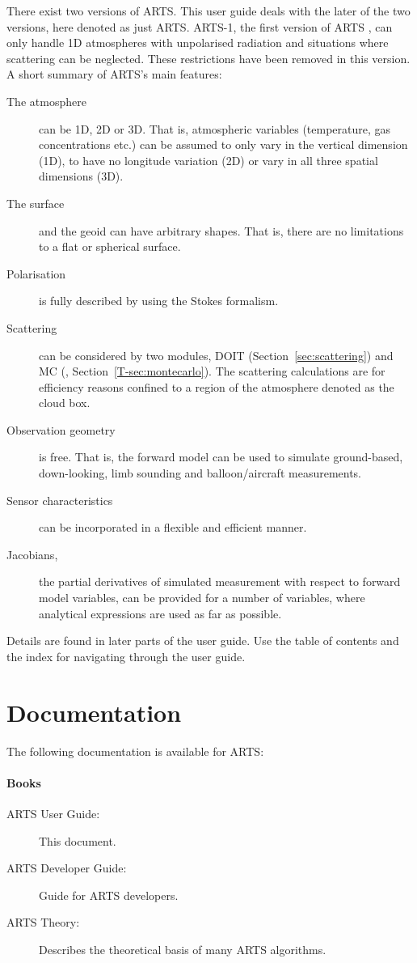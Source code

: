 There exist two versions of ARTS. This user guide deals with the later
of the two versions, here denoted as just ARTS. ARTS-1, the first
version of ARTS \citep{buehler:artst:05}, can only handle 1D
atmospheres with unpolarised radiation and situations where scattering
can be neglected. These restrictions have been removed in this
version. A short summary of ARTS's main features:
\begin{description}
\item[The atmosphere] can be 1D, 2D or 3D. That is, atmospheric
  variables (temperature, gas concentrations etc.) can be assumed to
  only vary in the vertical dimension (1D), to have no longitude
  variation (2D) or vary in all three spatial dimensions (3D).
\item[The surface] and the geoid can have arbitrary shapes. That is,
  there are no limitations to a flat or spherical surface.
\item[Polarisation] is fully described by using the Stokes formalism.
\item[Scattering] can be considered by two modules, DOIT
  (Section~\ref{sec:scattering}) and MC
  (\theory, Section~\ref{T-sec:montecarlo}). The scattering calculations are for
  efficiency reasons confined to a region of the atmosphere denoted as
  the cloud box.
\item[Observation geometry] is free. That is, the forward model can be
  used to simulate ground-based, down-looking, limb sounding and
  balloon/aircraft measurements.
\item[Sensor characteristics] can be incorporated in a flexible and
  efficient manner.
\item[Jacobians,] the partial derivatives of simulated measurement
  with respect to forward model variables, can be provided for a
  number of variables, where analytical expressions are used as far as
  possible.
\end{description}
Details are found in later parts of the user guide. Use the table of
contents and the index for navigating through the user guide.



\section{Documentation}
\label{sec:concept:doc}

The following documentation is available for ARTS:

\paragraph{Books}
\begin{description}
\item[ARTS User Guide:] This document.
\item[ARTS Developer Guide:] Guide for ARTS developers.
\item[ARTS Theory:] Describes the theoretical basis of many ARTS algorithms.
\end{description}

